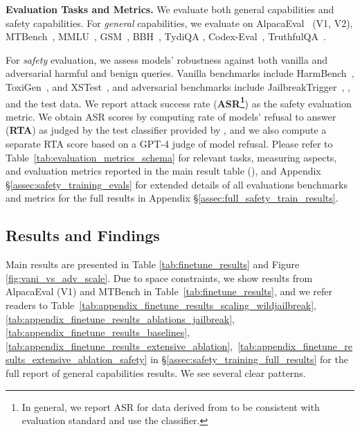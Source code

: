 \textbf{Evaluation Tasks and Metrics.}
We evaluate both general capabilities and safety capabilities. For \textit{general} capabilities, we evaluate on AlpacaEval~\citep{alpaca_eval} (V1, V2), MTBench~\citep{zheng2023judging}, MMLU~\citep{hendrycks2020measuring}, GSM~\citep{cobbe2021training},  BBH~\citep{suzgun2023challenging}, TydiQA \citep{clark2020tydi}, Codex-Eval~\citep{chen2021evaluating}, TruthfulQA~\citep{lin2022truthfulqa}.

For \textit{safety} evaluation, we assess models' robustness against both vanilla and adversarial harmful and benign queries. Vanilla benchmarks include HarmBench~\citep{mazeika2024harmbench}, ToxiGen~\citep{hartvigsen2022toxigen}, and XSTest~\citep{xstest}, and adversarial benchmarks include JailbreakTrigger~\citep{sun2024trustllm}, \danshort \citep{doanytingnow}, and the \dataset test data. We report attack success rate (\textbf{ASR\footnote{In general, we report ASR for data derived from \harmbench to be consistent with \harmbench evaluation standard and use the \harmbench classifier.}}) as the safety evaluation metric. We obtain ASR scores by computing rate of models' refusal to answer (\textbf{RTA}) as judged by the test classifier provided by \harmbench, and we also compute a separate RTA score based on a GPT-4 judge of model refusal. Please refer to Table~\ref{tab:evaluation_metrics_schema} for relevant tasks, measuring aspects, and evaluation metrics reported in the main result table (), and Appendix \S \ref{assec:safety_training_evals} for extended details of all evaluations benchmarks and metrics for the full results in Appendix \S \ref{assec:full_safety_train_results}. 



\subsection{Results and Findings}

Main results are presented in Table \ref{tab:finetune_results} and Figure \ref{fig:vani_vs_adv_scale}.  Due to space constraints, we show results from AlpacaEval (V1) and MTBench in Table~\ref{tab:finetune_results}, and we refer readers to Table~\ref{tab:appendix_finetune_results_scaling_wildjailbreak}, \ref{tab:appendix_finetune_results_ablations_jailbreak}, \ref{tab:appendix_finetune_results_baselines}, \ref{tab:appendix_finetune_results_extensive_ablation},~\ref{tab:appendix_finetune_results_extensive_ablation_safety} in \S\ref{assec:safety_training_full_results} for the full report of general capabilities results. We see several clear patterns.

